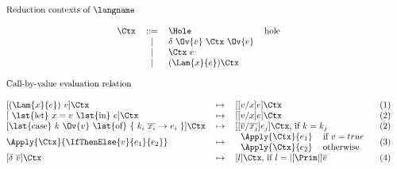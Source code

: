\begin{center}
\(\begin{array}{c}
\multicolumn{1}{l}{\text{Reduction contexts of \langname}}\\
\\
\begin{tabular}{@{}l c l l}
$\Ctx$ 	& ::= 		&	$\Hole$ 	&  hole \\
		& $\mid$ 	&	$\delta~\Ov{v}~\Ctx~\Ov{e}$	&  \\
		& $\mid$ 	&	$\Ctx~e$				&  \\
		& $\mid$ 	&	$(\Lam{x}{e})\Ctx$ 	&  \\
		& & \\
\end{tabular} \\
\multicolumn{1}{l}{\text{Call-by-value evaluation relation}}\\
\\
\begin{tabular}{@{}l c l r}
$[(\Lam{x}{e})~v]\Ctx$					& $\mapsto$	& 	$[[v/x]e]\Ctx$					    & (1)     \\
$[$ \lst{let} $x = v$ \lst{in} $e]\Ctx$	& $\mapsto$	& 	$[[v/x]e]\Ctx$					    & (2)     \\
$[$\lst{case} $k~\Ov{v}$ \lst{of} \{ $k_i~\overline{x_i}$ $\rightarrow$ $e_i$  \}$]\Ctx$   & $\mapsto$ 	& 	$[[\overline{v}/\overline{x_j}]e_j]\Ctx$, if $k = k_j$	& (2)    \\
$\Apply{\Ctx}{\IfThenElse{v}{e_1}{e_2}}$   & $\mapsto$ 	& \begin{tabular}{ l l}
													$\Apply{\Ctx}{e_1}$ & if $v = true$ \\
													$\Apply{\Ctx}{e_2}$ & otherwise
												  \end{tabular} & (3)    \\
$[\delta~\overline{v}]\Ctx$   & $\mapsto$ 	& 	$[l]\Ctx$, if $l = |[\Prim|]\overline{v}$					    & (4)     \\

\end{tabular}
\end{array}\)
\end{center}
